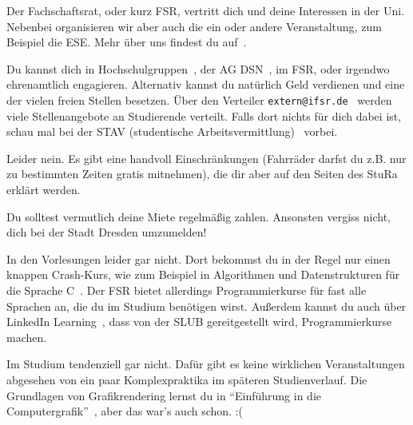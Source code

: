 Der Fachschaftsrat, oder kurz FSR, vertritt dich und deine Interessen in der Uni. Nebenbei organisieren wir aber auch die ein oder andere Veranstaltung, zum Beispiel die ESE. Mehr über uns findest du auf~.

Du kannst dich in Hochschulgruppen~, der AG DSN~, im FSR, oder irgendwo ehrenamtlich engagieren. Alternativ kannst du natürlich Geld verdienen und eine der vielen freien Stellen besetzen. Über den Verteiler \texttt{extern@ifsr.de}~ werden viele Stellenangebote an Studierende verteilt. Falls dort nichts für dich dabei ist, schau mal bei der STAV (studentische Arbeitsvermittlung)~ vorbei.

Leider nein. Es gibt eine handvoll Einschränkungen (Fahrräder darfst du z.B. nur zu bestimmten Zeiten gratis mitnehmen), die dir aber auf den Seiten des StuRa~ erklärt werden.

Du solltest vermutlich deine Miete regelmäßig zahlen. Ansonsten vergiss nicht, dich bei der Stadt Dresden umzumelden! 

In den Vorlesungen leider gar nicht. Dort bekommst du in der Regel nur einen knappen Crash-Kurs, wie zum Beispiel in Algorithmen und Datenstrukturen für die Sprache C~.
Der FSR bietet allerdings Programmierkurse für fast alle Sprachen an, die du im Studium benötigen wirst.  Außerdem kannst du auch über LinkedIn Learning~, dass von der SLUB gereitgestellt wird, Programmierkurse machen.

Im Studium tendenziell gar nicht. Dafür gibt es keine wirklichen Veranstaltungen abgesehen von ein paar Komplexpraktika im späteren Studienverlauf. Die Grundlagen von Grafikrendering lernst du in \enquote{Einführung in die Computergrafik}~, aber das war's auch schon. :(

